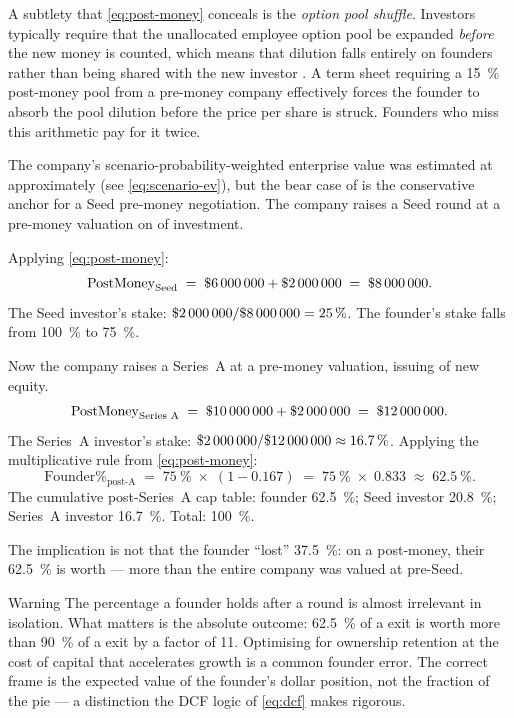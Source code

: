 A subtlety that \cref{eq:post-money} conceals is the \emph{option pool shuffle}. Investors
typically require that the unallocated employee option pool be expanded \emph{before} the new
money is counted, which means that dilution falls entirely on founders rather than being
shared with the new investor \parencite{feld2019venture}. A term sheet requiring a
\qty{15}{\percent} post-money pool from a  pre-money company effectively
forces the founder to absorb the pool dilution before the price per share is struck. Founders
who miss this arithmetic pay for it twice.

\begin{example}
The company's scenario-probability-weighted enterprise value was estimated at approximately
 (see \cref{eq:scenario-ev}), but the bear case of  is the
conservative anchor for a Seed pre-money negotiation. The company raises a Seed round at a
 pre-money valuation on  of investment.

Applying \cref{eq:post-money}:
\[
  \mathrm{PostMoney}_{\text{Seed}} \;=\; \$\num{6000000} + \$\num{2000000} \;=\; \$\num{8000000}.
\]
The Seed investor's stake: \(\$\num{2000000}/\$\num{8000000} = \qty{25}{\percent}\). The
founder's stake falls from \qty{100}{\percent} to \qty{75}{\percent}.

Now the company raises a Series~A at a  pre-money valuation, issuing
 of new equity.
\[
  \mathrm{PostMoney}_{\text{Series A}} \;=\; \$\num{10000000} + \$\num{2000000} \;=\; \$\num{12000000}.
\]
The Series~A investor's stake: \(\$\num{2000000}/\$\num{12000000} \approx \qty{16.7}{\percent}\).
Applying the multiplicative rule from \cref{eq:post-money}:
\[
  \text{Founder\%}_{\text{post-A}}
  \;=\; \qty{75}{\percent} \;\times\; (1 - 0.167)
  \;=\; \qty{75}{\percent} \;\times\; 0.833
  \;\approx\; \qty{62.5}{\percent}.
\]
The cumulative post-Series~A cap table: founder \qty{62.5}{\percent}; Seed investor \qty{20.8}{\percent};
Series~A investor \qty{16.7}{\percent}. Total: \qty{100}{\percent}.

The implication is not that the founder ``lost'' \qty{37.5}{\percent}: on a 
post-money, their \qty{62.5}{\percent} is worth  --- more than the entire
company was valued at pre-Seed.
\end{example}

\begin{admonition}{Warning}
The percentage a founder holds after a round is almost irrelevant in isolation. What matters
is the absolute outcome: \qty{62.5}{\percent} of a  exit is worth more than
\qty{90}{\percent} of a  exit by a factor of 11. Optimising for ownership
retention at the cost of capital that accelerates growth is a common founder error. The
correct frame is the expected value of the founder's dollar position, not the fraction of the
pie --- a distinction the DCF logic of \cref{eq:dcf} makes rigorous.
\end{admonition}

